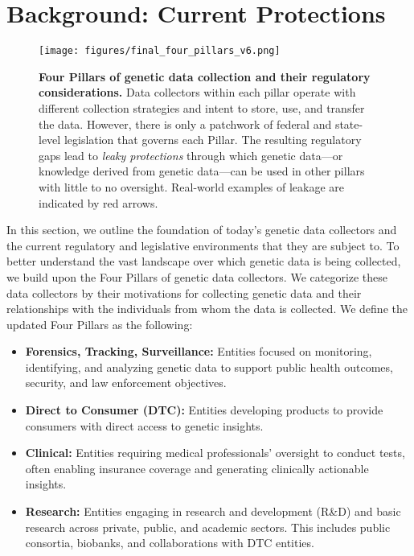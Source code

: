 \section{Background: Current Protections}
\label{section:protections}


\begin{figure}[H]
    \centering
    \texttt{[image: figures/final\_four\_pillars\_v6.png]}
    \caption{\textbf{Four Pillars of genetic data collection and their regulatory considerations.} Data collectors within each pillar operate with different collection strategies and intent to store, use, and transfer the data. However, there is only a patchwork of federal and state-level legislation that governs each Pillar. The resulting regulatory gaps lead to \textit{leaky protections} through which genetic data—or knowledge derived from genetic data—can be used in other pillars with little to no oversight. Real-world examples\protect\footnotemark{} of leakage are indicated by red arrows.}
    \label{fig:4_pillars}
\end{figure}




In this section, we outline the foundation of today's genetic data collectors and the current regulatory and legislative environments that they are subject to. To better understand the vast landscape over which genetic data is being collected, we build upon the Four Pillars \cite{wan_sociotechnical_2022} of genetic data collectors. We categorize these data collectors by their motivations for collecting genetic data and their relationships with the individuals from whom the data is collected. We define the updated Four Pillars as the following:
\begin{itemize}
    \item \textbf{Forensics, Tracking, Surveillance:} Entities focused on monitoring, identifying, and analyzing genetic data to support public health outcomes, security, and law enforcement objectives.
    \item \textbf{Direct to Consumer (DTC):} Entities developing products to provide consumers with direct access to genetic insights.
    \item \textbf{Clinical:} Entities requiring medical professionals' oversight to conduct tests, often enabling insurance coverage and generating clinically actionable insights.
    \item \textbf{Research:} Entities engaging in research and development (R\&D) and basic research across private, public, and academic sectors. This includes public consortia, biobanks, and collaborations with DTC entities.
\end{itemize}

